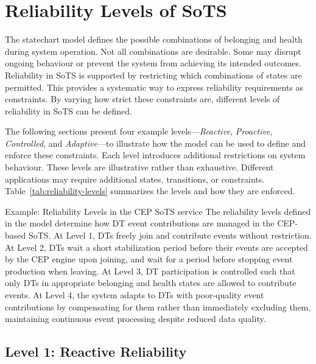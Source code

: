 \section{Reliability Levels of SoTS}\label{sec:reliability-levels}
The statechart model defines the possible combinations of belonging and health during system operation. Not all combinations are desirable. Some may disrupt ongoing behaviour or prevent the system from achieving its intended outcomes. Reliability in SoTS is supported by restricting which combinations of states are permitted. This provides a systematic way to express reliability requirements as constraints. By varying how strict these constraints are, different levels of reliability in SoTS can be defined.



The following sections present four example levels---\textit{Reactive}, \textit{Proactive}, \textit{Controlled}, and \textit{Adaptive}---to illustrate how the model can be used to define and enforce these constraints. Each level introduces additional restrictions on system behaviour. These levels are illustrative rather than exhaustive. Different applications may require additional states, transitions, or constraints. Table~\ref{tab:reliability-levels} summarizes the levels and how they are enforced.


\begin{runningexample}{Example: Reliability Levels in the CEP SoTS service}
The reliability levels defined in the model determine how DT event contributions are managed in the CEP-based SoTS. At Level 1, DTs freely join and contribute events without restriction. At Level 2, DTs wait a short stabilization period before their events are accepted by the CEP engine upon joining, and wait for a period before stopping event production when leaving. At Level 3, DT participation is controlled such that only DTs in appropriate belonging and health states are allowed to contribute events. At Level 4, the system adapts to DTs with poor-quality event contributions by compensating for them rather than immediately excluding them, maintaining continuous event processing despite reduced data quality.
\end{runningexample}


\subsection{Level 1: Reactive Reliability}

